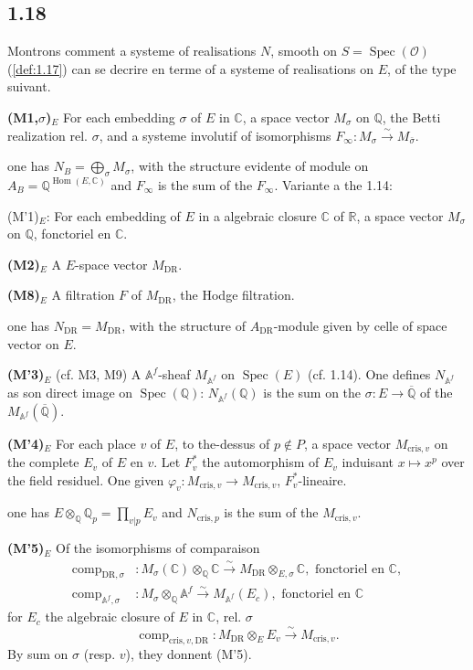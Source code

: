 \documentclass[12pt,a4paper]{article}
\theoremstyle{plain}
\theoremstyle{definition}
\theoremstyle{remark}
\DeclareMathOperator{\Spec}{Spec}
\DeclareMathOperator{\Hom}{Hom}
\providecommand{\Hom}{\operatorname{Hom}}
\providecommand{\Spec}{\operatorname{Spec}}
\providecommand{\DR}{\mathrm{DR}}
\providecommand{\cris}{\mathrm{cris}}
\providecommand{\comp}{\operatorname{comp}}
\begin{document}
\subsection*{1.18}

Montrons comment a systeme of realisations $N$, smooth on $S =
\Spec(\mathcal{O})$ (\ref{def:1.17}) can se decrire en terme of a systeme of
realisations on $E$, of the type suivant.

\textbf{(M1,$\sigma$)$_E$} For each embedding $\sigma$ of $E$ in $\mathbb{C}$, a
space vector $M_\sigma$ on $\mathbb{Q}$, the Betti realization rel. $\sigma$, and
a systeme involutif of isomorphisms $F_\infty: M_\sigma \xrightarrow{\sim}
M_{\bar{\sigma}}$.

one has $N_B = \bigoplus_\sigma M_\sigma$, with the structure evidente of module on
$A_B = \mathbb{Q}^{\Hom(E,\mathbb{C})}$ and $F_\infty$ is the sum of the
$F_\infty$. Variante a the 1.14:

(M'1)$_E$: For each embedding of $E$ in a algebraic closure
$\mathbb{C}$ of $\mathbb{R}$, a space vector $M_\sigma$ on $\mathbb{Q}$,
fonctoriel en $\mathbb{C}$.

\textbf{(M2)$_E$} A $E$-space vector $M_{\DR}$.

\textbf{(M8)$_E$} A filtration $F$ of $M_{\DR}$, the Hodge filtration.

one has $N_{\DR} = M_{\DR}$, with the structure of $A_{\DR}$-module given by celle
of space vector on $E$.

\textbf{(M'3)$_E$} (cf. M3, M9) A $\mathbb{A}^f$-sheaf $M_{\mathbb{A}^f}$ on
$\Spec(E)$ (cf. 1.14). One defines $N_{\mathbb{A}^f}$ as son direct image on
$\Spec(\mathbb{Q})$: $N_{\mathbb{A}^f}(\mathbb{Q})$ is the sum on the
$\sigma: E \to \overline{\mathbb{Q}}$ of the $M_{\mathbb{A}^f}(\overline{\mathbb{Q}})$.

\textbf{(M'4)$_E$} For each place $v$ of $E$, to the-dessus of $p \notin P$, a space
vector $M_{\cris,v}$ on the complete $E_v$ of $E$ en $v$. Let $F_v^*$ the automorphism
of $E_v$ induisant $x \mapsto x^p$ over the field residuel. One given
$\varphi_v: M_{\cris,v} \to M_{\cris,v}$, $F_v^*$-lineaire.

one has $E \otimes_{\mathbb{Q}} \mathbb{Q}_p = \prod_{v|p} E_v$ and $N_{\cris,p}$ is the sum
of the $M_{\cris,v}$.

\textbf{(M'5)$_E$} Of the isomorphisms of comparaison
\begin{align*}
\comp_{\DR,\sigma} &: M_\sigma(\mathbb{C}) \otimes_{\mathbb{Q}} \mathbb{C}
\xrightarrow{\sim} M_{\DR} \otimes_{E,\sigma} \mathbb{C}, \text{ fonctoriel en } \mathbb{C},\\
\comp_{\mathbb{A}^f,\sigma} &: M_\sigma \otimes_{\mathbb{Q}} \mathbb{A}^f
\xrightarrow{\sim} M_{\mathbb{A}^f}(E_c), \text{ fonctoriel en } \mathbb{C}
\end{align*}
for $E_c$ the algebraic closure of $E$ in $\mathbb{C}$, rel. $\sigma$
\[
\comp_{\cris,v,\DR}: M_{\DR} \otimes_E E_v \xrightarrow{\sim} M_{\cris,v}.
\]
By sum on $\sigma$ (resp. $v$), they donnent (M'5).
\end{document}

